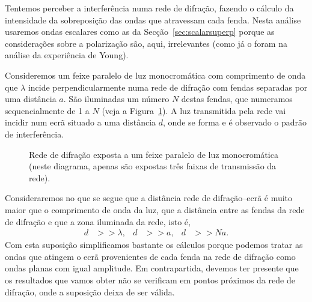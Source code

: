 Tentemos perceber a interferência numa rede de difração, fazendo o cálculo da
intensidade da sobreposição das ondas que atravessam cada fenda.
 Nesta análise usaremos ondas escalares como as da
Secção~\ref{sec:scalarsuperp} porque as considerações sobre a polarização são,
aqui, irrelevantes (como já o foram na análise da experiência de
Young).

Consideremos um feixe paralelo de luz monocromática com comprimento de onda que
$\lambda$ incide perpendicularmente numa rede de difração com fendas separadas
por uma distância $a$. São iluminadas um número $N$ destas fendas, que
numeramos sequencialmente de 1 a $N$ (veja a Figura~\ref{fig:gratingb}). A luz
transmitida pela rede vai incidir num ecrã situado a uma distância $d$, onde se
forma e é observado o padrão de interferência.
\begin{figure}[htb]
  {\centering
    \par
  }
  \caption{\label{fig:gratingb}Rede de difração exposta a um feixe paralelo de
    luz monocromática (neste diagrama, apenas são expostas três faixas de
  transmissão da rede).}
\end{figure}
Consideraremos no que se segue que a distância rede de difração--ecrã é muito
maior que o comprimento de onda da luz, que a distância entre as fendas da rede
de difração e que a zona iluminada da rede, isto é,
\begin{align*}
  d&>>\lambda,&d&>>a, & d&>>Na.
\end{align*}
Com esta suposição simplificamos bastante os cálculos porque podemos tratar as
ondas que atingem o ecrã provenientes de cada fenda na rede de difração como
ondas planas com igual amplitude. Em contrapartida, devemos ter presente que os
resultados que vamos obter não se verificam em pontos próximos da rede de
difração, onde a suposição deixa de ser válida.

